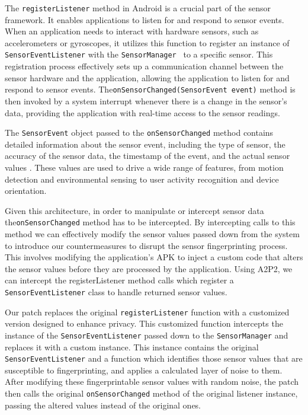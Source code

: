 \documentclass[11pt,
  oneside,openany,    %
]{scrreprt}
\begin{document}
The \verb|registerListener| method in Android is a crucial part of the sensor framework. 
It enables applications to listen for and respond to sensor events.
When an application needs to interact with hardware sensors, such as accelerometers or gyroscopes, it utilizes this function to register an instance of \verb|SensorEventListener| with the \verb|SensorManager|~\cite{android_sensormanager} to a specific sensor.
This registration process effectively sets up a communication channel between the sensor hardware and the application, allowing the application to listen for and respond to sensor events.
The\linebreak\verb|onSensorChanged(SensorEvent event)| method is then invoked by a system interrupt whenever there is a change in the sensor's data, providing the application with real-time access to the sensor readings.

The \verb|SensorEvent| object passed to the \verb|onSensorChanged| method contains detailed information about the sensor event, including the type of sensor, the accuracy of the sensor data, the timestamp of the event, and the actual sensor values \cite{android_sensorevent}.
These values are used to drive a wide range of features, from motion detection and environmental sensing to user activity recognition and device orientation.

Given this architecture, in order to manipulate or intercept sensor data the\linebreak\verb|onSensorChanged| method has to be intercepted.
By intercepting calls to this method we can effectively modify the sensor values passed down from the system to introduce our countermeasures to disrupt the sensor fingerprinting process.
This involves modifying the application's APK to inject a custom code that alters the sensor values before they are processed by the application.
Using A2P2, we can intercept the registerListener method calls which register a \verb|SensorEventListener| class to handle returned sensor values.

Our patch replaces the original \verb|registerListener| function with a customized version designed to enhance privacy.
This customized function intercepts the instance of the \verb|SensorEventListener| passed down to the \verb|SensorManager| and replaces it with a custom instance.
This instance contains the original \verb|SensorEventListener| and a function which identifies those sensor values that are susceptible to fingerprinting, and applies a calculated layer of noise to them.
After modifying these fingerprintable sensor values with random noise, the patch then calls the original \verb|onSensorChanged| method of the original listener instance, passing the altered values instead of the original ones.
\end{document}
